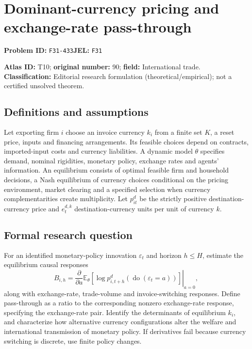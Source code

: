 \documentclass[11pt,a4paper]{article}
\begin{document}
\section*{Dominant-currency pricing and exchange-rate pass-through}
\textbf{Problem ID:} \texttt{F31-433}\quad \textbf{JEL:} \texttt{F31}\par
\label{problem:OP-0090}
\label{atlas:prob:T10}

\noindent\textbf{Atlas ID:} T10; \textbf{original number:} 90; \textbf{field:} International trade. \textbf{Classification:} Editorial research formulation (theoretical/empirical); not a certified unsolved theorem.

\subsection*{Definitions and assumptions}
Let exporting firm $i$ choose an invoice currency $k_i$ from a finite set $K$, a reset price, inputs and financing arrangements. Its feasible choices depend on contracts, imported-input costs and currency liabilities. A dynamic model $\theta$ specifies demand, nominal rigidities, monetary policy, exchange rates and agents’ information. An equilibrium consists of optimal feasible firm and household decisions, a Nash equilibrium of currency choices conditional on the pricing environment, market clearing and a specified selection when currency complementarities create multiplicity. Let $p_{it}^d$ be the strictly positive destination-currency price and $e_t^{d,k}$ destination-currency units per unit of currency $k$.

\subsection*{Formal research question}
For an identified monetary-policy innovation $\varepsilon_t$ and horizon $h\le H$, estimate the equilibrium causal responses
\[
 B_{i,h}=\left.\frac{\partial}{\partial a}
 \mathbb E_\theta[\log p_{i,t+h}^{d}(\operatorname{do}(\varepsilon_t=a))]
 \right|_{a=0},
\]
along with exchange-rate, trade-volume and invoice-switching responses. Define pass-through as a ratio to the corresponding nonzero exchange-rate response, specifying the exchange-rate pair. Identify the determinants of equilibrium $k_i$, and characterize how alternative currency configurations alter the welfare and international transmission of monetary policy. If derivatives fail because currency switching is discrete, use finite policy changes.
\end{document}
